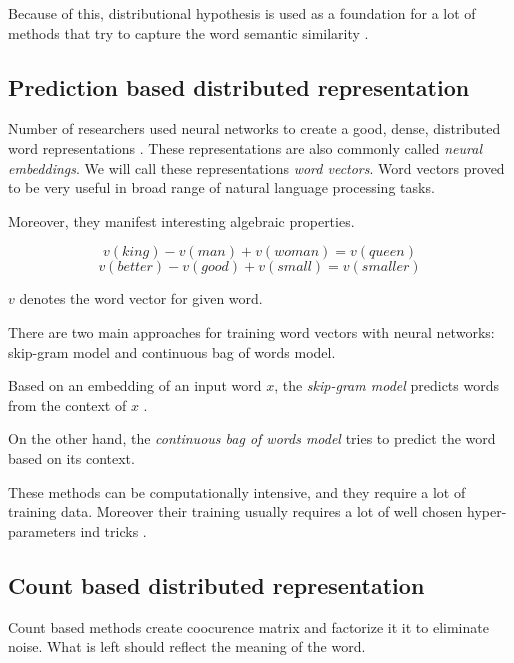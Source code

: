     Because of this, distributional hypothesis is used as a foundation for a lot of methods that try to capture the word semantic similarity \cite{rubenstein1965contextual}. 

    \subsection{Prediction based distributed representation}
    
    Number of researchers used neural networks to create a good, dense, distributed word representations \cite{pennington2014glove} \cite{DBLP:conf/icml/LeM14} \cite{rong2014word2vec}. %
    These representations are also commonly called \emph{neural embeddings}.
    We will call these representations \emph{word vectors}.
    Word vectors proved to be very useful in broad range of natural language processing tasks. 
    
    Moreover, they manifest interesting algebraic properties. 
    
    $$v(king) - v(man) + v(woman) = v(queen)$$
    $$v(better) - v(good) + v(small) = v(smaller)$$
    
    $v$ denotes the word vector for given word.
    
    There are two main approaches for training word vectors with neural networks: skip-gram model and continuous bag of words model.
    
    Based on an embedding of an input word $x$, the \textit{skip-gram model} predicts words from the context of $x$ .
    
    On the other hand, the \textit{continuous bag of words model} tries to predict the word based on its context.
    
    These methods can be computationally intensive, and they require a lot of training data. 
    Moreover their training usually requires a lot of well chosen hyper-parameters ind tricks \cite{DBLP:journals/corr/MikolovSCCD13}. %
    \* %
    

    \subsection{Count based distributed representation}
    \* %
    
    Count based methods create coocurence matrix and factorize it it to eliminate noise. 
    What is left should reflect the meaning of the word. 
    
